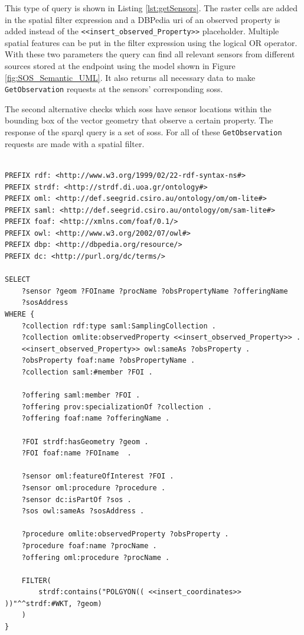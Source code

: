 This type of query is shown in Listing \ref{lst:getSensors}. The raster cells are added in the spatial filter expression and a DBPedia \ac{uri} of an observed property is added instead of the \texttt{<<insert\_observed\_Property>>} placeholder. Multiple spatial features can be put in the filter expression using the logical OR operator. With these two parameters the query can find all relevant sensors from different sources stored at the endpoint using the model shown in Figure \ref{fig:SOS_Semantic_UML}. It also returns all necessary data to make \texttt{GetObservation} requests at the sensors' corresponding \aclp{sos}.

The second alternative checks which \aclp{sos} have sensor locations within the bounding box of the vector geometry that observe a certain property. The response of the \ac{sparql} query is a set of \aclp{sos}. For all of these \texttt{GetObservation} requests are made with a spatial filter. 

\begin{lstlisting}[float,caption={A spatial SPARQL query for discovering sensors and their SOS related metadata}, label={lst:getSensors}]

PREFIX rdf: <http://www.w3.org/1999/02/22-rdf-syntax-ns#>
PREFIX strdf: <http://strdf.di.uoa.gr/ontology#>
PREFIX oml: <http://def.seegrid.csiro.au/ontology/om/om-lite#>
PREFIX saml: <http://def.seegrid.csiro.au/ontology/om/sam-lite#>
PREFIX foaf: <http://xmlns.com/foaf/0.1/>
PREFIX owl: <http://www.w3.org/2002/07/owl#>
PREFIX dbp: <http://dbpedia.org/resource/>
PREFIX dc: <http://purl.org/dc/terms/>

SELECT 
	?sensor ?geom ?FOIname ?procName ?obsPropertyName ?offeringName 
	?sosAddress
WHERE {
	?collection rdf:type saml:SamplingCollection .
	?collection omlite:observedProperty <<insert_observed_Property>> .
	<<insert_observed_Property>> owl:sameAs ?obsProperty .
	?obsProperty foaf:name ?obsPropertyName .
	?collection saml:#member ?FOI .
	
	?offering saml:member ?FOI . 
	?offering prov:specializationOf ?collection .
	?offering foaf:name ?offeringName .
	
	?FOI strdf:hasGeometry ?geom . 
	?FOI foaf:name ?FOIname  .
	
	?sensor oml:featureOfInterest ?FOI .
	?sensor oml:procedure ?procedure .
	?sensor dc:isPartOf ?sos .
	?sos owl:sameAs ?sosAddress .
	
	?procedure omlite:observedProperty ?obsProperty .
	?procedure foaf:name ?procName .
	?offering oml:procedure ?procName .
	
	FILTER(
		strdf:contains("POLGYON(( <<insert_coordinates>> ))"^^strdf:#WKT, ?geom)
	)		
}
\end{lstlisting}

